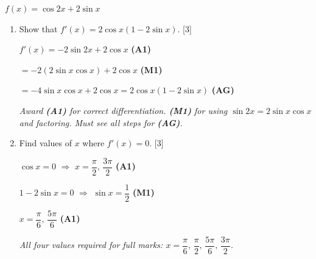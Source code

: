 \documentclass[12pt, twoside]{article}
\begin{document}
\begin{enumerate}
$f(x) = \cos 2x + 2\sin x$

\begin{enumerate}
\item[(a)] Show that $f'(x) = 2\cos x(1 - 2\sin x)$. \hfill [3]

$f'(x) = -2\sin 2x + 2\cos x$ \hfill \textbf{(A1)}

$= -2(2\sin x\cos x) + 2\cos x$ \hfill \textbf{(M1)}

$= -4\sin x\cos x + 2\cos x = 2\cos x(1 - 2\sin x)$ \hfill \textbf{(AG)}

\textit{Award \textbf{(A1)} for correct differentiation. \textbf{(M1)} for using
$\sin 2x = 2\sin x\cos x$ and factoring. Must see all steps for \textbf{(AG)}.}

\item[(b)] Find values of $x$ where $f'(x) = 0$. \hfill [3]

$\cos x = 0$ \quad $\Rightarrow$ \quad $x = \dfrac{\pi}{2},\, \dfrac{3\pi}{2}$ \hfill \textbf{(A1)}

$1 - 2\sin x = 0$ \quad $\Rightarrow$ \quad $\sin x = \dfrac{1}{2}$ \hfill \textbf{(M1)}

$x = \dfrac{\pi}{6},\, \dfrac{5\pi}{6}$ \hfill \textbf{(A1)}

\textit{All four values required for full marks:
$x = \dfrac{\pi}{6},\, \dfrac{\pi}{2},\, \dfrac{5\pi}{6},\, \dfrac{3\pi}{2}$.}
\end{enumerate}

\end{enumerate}
\end{document}

